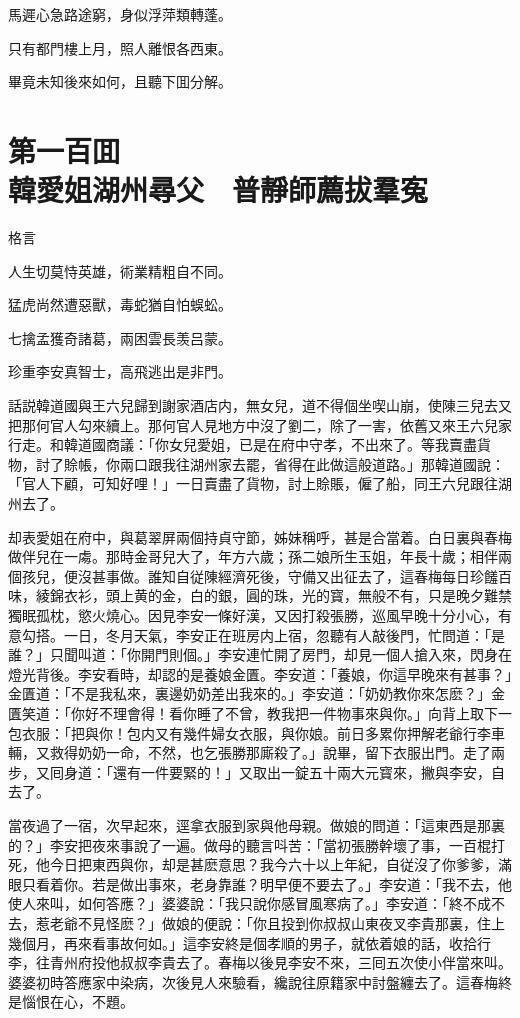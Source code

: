 馬遲心急路途窮，身似浮萍類轉蓬。

只有都門樓上月，照人離恨各西東。

畢竟未知後來如何，且聽下囬分解。

\chapter*{第一百囬　\\韓愛姐湖州尋父　普靜師薦拔羣寃}

格言
\begin{myquote}
人生切莫恃英雄，術業精粗自不同。

猛虎尚然遭惡獸，毒蛇猶自怕蜈蚣。

七擒孟獲奇諸葛，兩困雲長羡吕蒙。

珍重李安真智士，高飛逃出是非門。
\end{myquote}

話説韓道國與王六兒歸到謝家酒店内，無女兒，道不得個坐喫山崩，使陳三兒去又把那何官人勾來續上。那何官人見地方中沒了劉二，除了一害，依舊又來王六兒家行走。和韓道國商議：「你女兒愛姐，已是在府中守孝，不出來了。等我賣盡貨物，討了賒帳，你兩口跟我往湖州家去罷，省得在此做這般道路。」那韓道國說：「官人下顧，可知好哩！」一日賣盡了貨物，討上賒賬，僱了船，同王六兒跟往湖州去了。

却表愛姐在府中，與葛翠屏兩個持貞守節，姊妹稱呼，甚是合當着。白日裏與春梅做伴兒在一䖏。那時金哥兒大了，年方六歲；孫二娘所生玉姐，年長十歲；相伴兩個孩兒，便沒甚事做。誰知自従陳經濟死後，守備又出征去了，這春梅每日珍饈百味，綾錦衣衫，頭上黄的金，白的銀，圓的珠，光的寳，無般不有，只是晚夕難禁獨眠孤枕，慾火燒心。因見李安一條好漢，又因打殺張勝，巡風早晚十分小心，有意勾搭。一日，冬月天氣，李安正在班房内上宿，忽聽有人敲後門，忙問道：「是誰？」只聞叫道：「你開門則個。」李安連忙開了房門，却見一個人搶入來，閃身在燈光背後。李安看時，却認的是養娘金匱。李安道：「養娘，你這早晚來有甚事？」金匱道：「不是我私來，裏邊奶奶差出我來的。」李安道：「奶奶教你來怎麽？」金匱笑道：「你好不理會得！看你睡了不曾，教我把一件物事來與你。」向背上取下一包衣服：「把與你！包内又有幾件婦女衣服，與你娘。前日多累你押解老爺行李車輛，又救得奶奶一命，不然，也乞張勝那廝殺了。」說畢，留下衣服出門。走了兩步，又囘身道：「還有一件要緊的！」又取出一錠五十兩大元寳來，撇與李安，自去了。

當夜過了一宿，次早起來，逕拿衣服到家與他母親。做娘的問道：「這東西是那裏的？」李安把夜來事說了一遍。做母的聽言呌苦：「當初張勝幹壞了事，一百棍打死，他今日把東西與你，却是甚麽意思？我今六十以上年紀，自従沒了你爹爹，滿眼只看着你。若是做出事來，老身靠誰？明早便不要去了。」李安道：「我不去，他使人來叫，如何答應？」婆婆說：「我只說你感冒風寒病了。」李安道：「終不成不去，惹老爺不見怪麽？」做娘的便說：「你且投到你叔叔山東夜叉李貴那裏，住上幾個月，再來看事故何如。」這李安終是個孝順的男子，就依着娘的話，收拾行李，往青州府投他叔叔李貴去了。春梅以後見李安不來，三囘五次使小伴當來叫。婆婆初時答應家中染病，次後見人來驗看，纔說往原籍家中討盤纏去了。這春梅終是惱恨在心，不題。

